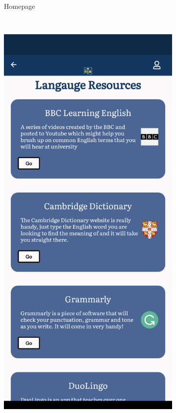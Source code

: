 \documentclass{l4proj}
\begin{document}
\begin{figure}[ht]
\begin{subfigure}[b]{0.25\textwidth}
        \caption{Homepage}
        \label{fig:preparehome}
    \end{subfigure}
    ~ %
    \begin{subfigure}[b]{0.25\textwidth}
        \includegraphics[width=\textwidth]{images/prepareBackground2.pdf}

\end{subfigure}
\end{figure}
\end{document}
